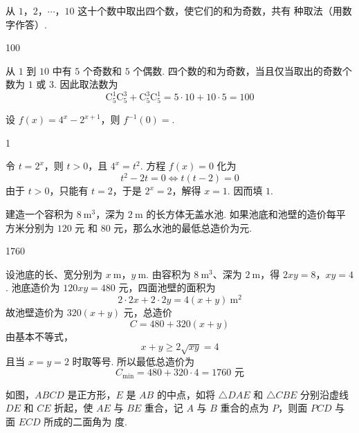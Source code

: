 \documentclass[UTF8,a4paper,oneside,11pt]{ctexbook}
\begin{document}
\begin{problem}
从 \(1\)，\(2\)，\(\cdots\)，\(10\) 这十个数中取出四个数，使它们的和为奇数，共有\fillinblank{} 种取法（用数字作答）.
\end{problem}

\begin{answer}
100
\end{answer}

\begin{solution}
从 \(1\) 到 \(10\) 中有 \(5\) 个奇数和 \(5\) 个偶数. 四个数的和为奇数，当且仅当取出的奇数个数为 \(1\) 或 \(3\). 因此取法数为
\[
\mathrm C_5^1\mathrm C_5^3+\mathrm C_5^3\mathrm C_5^1
=5\cdot10+10\cdot5=100
\]
\end{solution}

\begin{problem}
设 \(f(x)=4^x-2^{x+1}\)，则 \(f^{-1}(0)=\)\fillinblank{}.
\end{problem}

\begin{answer}
1
\end{answer}

\begin{solution}
令 \(t=2^x\)，则 \(t>0\)，且 \(4^x=t^2\). 方程 \(f(x)=0\) 化为
\[
t^2-2t=0
\Longleftrightarrow
t(t-2)=0
\]
由于 \(t>0\)，只能有 \(t=2\)，于是 \(2^x=2\)，解得 \(x=1\). 因而填 \(1\).
\end{solution}

\begin{problem}
建造一个容积为 \(8\mathrm{~m}^3\)，深为 \(2\mathrm{~m}\) 的长方体无盖水池. 如果池底和池壁的造价每平方米分别为 \(120\text{ 元}\) 和 \(80\text{ 元}\)，那么水池的最低总造价为\fillinblank{}\(\text{元}\).
\end{problem}

\begin{answer}
1760
\end{answer}

\begin{solution}
设池底的长、宽分别为 \(x\mathrm{~m}\)，\(y\mathrm{~m}\). 由容积为 \(8\mathrm{~m}^3\)、深为 \(2\mathrm{~m}\)，得
\(2xy=8\)，\(xy=4\).
池底造价为 \(120xy=480\) 元，四面池壁的面积为
\[
2\cdot2x+2\cdot2y=4(x+y)\mathrm{~m}^2
\]
故池壁造价为 \(320(x+y)\) 元，总造价
\[
C=480+320(x+y)
\]
由基本不等式，
\[
x+y\geq2\sqrt{xy}=4
\]
且当 \(x=y=2\) 时取等号. 所以最低总造价为
\[
C_{\min}=480+320\cdot4=1760\text{ 元}
\]
\end{solution}

\begin{problem}
如图，\(ABCD\) 是正方形，\(E\) 是 \(AB\) 的中点，如将 \(\triangle DAE\) 和 \(\triangle CBE\) 分别沿虚线 \(DE\) 和 \(CE\) 折起，使 \(AE\) 与 \(BE\) 重合，记 \(A\) 与 \(B\) 重合的点为 \(P\)，则面 \(PCD\) 与面 \(ECD\) 所成的二面角为\fillinblank{} 度.

\FloatBarrier
\end{problem}
\end{document}
